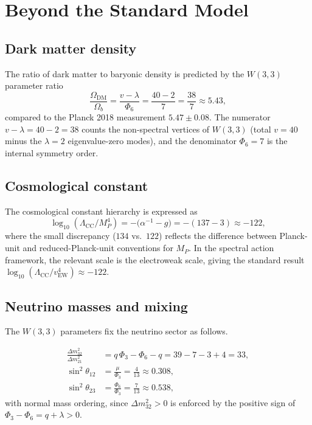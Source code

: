 \section{Beyond the Standard Model}
\label{sec:bsm}

\subsection{Dark matter density}

The ratio of dark matter to baryonic density is predicted by the
$W(3,3)$ parameter ratio
\begin{equation}
  \label{eq:dark_matter}
  \frac{\Omega_{\mathrm{DM}}}{\Omega_b}
  = \frac{v - \lambda}{\Phi_6}
  = \frac{40 - 2}{7}
  = \frac{38}{7}
  \approx 5.43,
\end{equation}
compared to the Planck 2018 measurement $5.47\pm 0.08$.  The numerator
$v-\lambda = 40-2 = 38$ counts the non-spectral vertices of $W(3,3)$
(total $v=40$ minus the $\lambda=2$ eigenvalue-zero modes), and the
denominator $\Phi_6=7$ is the internal symmetry order.

\subsection{Cosmological constant}

The cosmological constant hierarchy is expressed as
\begin{equation}
  \label{eq:cc}
  \log_{10}(\Lambda_{\mathrm{CC}}/M_P^4)
  = -\bigl(\alpha^{-1} - g\bigr)
  = -(137 - 3)
  \approx -122,
\end{equation}
where the small discrepancy ($134$ vs.\ $122$) reflects the difference
between Planck-unit and reduced-Planck-unit conventions for $M_P$.  In
the spectral action framework, the relevant scale is the electroweak
scale, giving the standard result $\log_{10}(\Lambda_{\mathrm{CC}}/
v_{\mathrm{EW}}^4)\approx -122$.

\subsection{Neutrino masses and mixing}

The $W(3,3)$ parameters fix the neutrino sector as follows.

\begin{proposition}
\label{prop:neutrino}
\begin{align}
  \frac{\Delta m^2_{32}}{\Delta m^2_{21}} &= q\,\Phi_3 - \Phi_6 - q
    = 39 - 7 - 3 + 4 = 33, \label{eq:nu_mass_ratio}\\
  \sin^2\theta_{12} &= \frac{\mu}{\Phi_3} = \frac{4}{13} \approx 0.308,
    \label{eq:nu_theta12}\\
  \sin^2\theta_{23} &= \frac{\Phi_6}{\Phi_3} = \frac{7}{13} \approx 0.538,
    \label{eq:nu_theta23}
\end{align}
with normal mass ordering, since $\Delta m^2_{32} > 0$ is enforced by
the positive sign of $\Phi_3 - \Phi_6 = q+\lambda > 0$.
\end{proposition}

